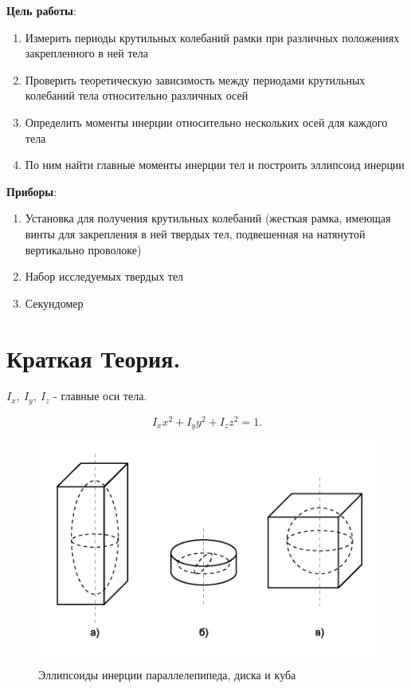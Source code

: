 \documentclass[a4paper,12pt]{article} %
\begin{document}

\textbf{Цель работы}:
\begin{enumerate}
\item Измерить периоды крутильных колебаний рамки при различных положениях закрепленного в ней тела
\item Проверить теорети­ческую зависимость между периодами крутильных колебаний тела относительно различных осей
\item Определить моменты инерции относи­тельно нескольких осей для каждого тела
\item По ним найти главные моменты инерции тел и построить эллипсоид инерции
\end{enumerate}

\textbf{Приборы}:
\begin{enumerate}
\item Установка для получения крутильных колебаний (жесткая рамка, имеющая винты для закрепления в ней твердых тел, подвешенная на натянутой вертикально проволоке)
\item На­бор исследуемых твердых тел
\item Секундомер
\end{enumerate}

\section{Краткая Теория.}

$I_x,\ I_y,\ I_z$ - главные оси тела.

\begin{equation} I_x x^2 + I_y y^2 + I_z z^2 = 1. \label{eq:1} \end{equation}

\begin{figure} [h] \center
	\includegraphics[scale = 1]{124/рис. 1.png}
	\label{pic:1} \caption[Рис. 1]{Эллипсоиды инерции параллелепипеда, диска и куба}
\end{figure}
\end{document}

